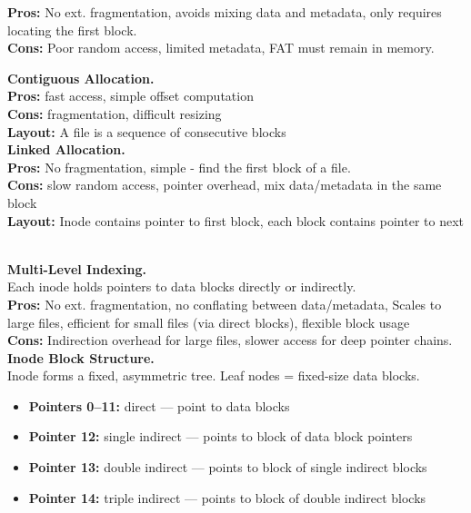 \documentclass[8pt]{extarticle}
\begin{document}
\begin{minipage}[htp]{0.5\textwidth}
\begin{minipage}[htp]{0.49\textwidth}
\textbf{Pros:} No ext. fragmentation, avoids mixing data and metadata, only requires locating the first block.\\
\textbf{Cons:} Poor random access, limited metadata, FAT must remain in memory.
\end{minipage}
\hfill
\begin{minipage}[htp]{0.49\textwidth}
\noindent\textbf{Contiguous Allocation.}\\
\textbf{Pros:} fast access, simple offset computation\\
\textbf{Cons:} fragmentation, difficult resizing\\
\textbf{Layout:} A file is a sequence of consecutive blocks\\[5px]
\noindent\textbf{Linked Allocation.}\\
\textbf{Pros:} No fragmentation, simple - find the first block of a file. \\\textbf{Cons:} slow random access, pointer overhead, mix data/metadata in the same block \\
\textbf{Layout:} Inode contains pointer to first block, each block contains pointer to next
\end{minipage}\\[2px]
\textbf{Multi-Level Indexing.} \\
Each inode holds pointers to data blocks directly or indirectly.\\
\noindent\textbf{Pros:} No ext. fragmentation, no conflating between data/metadata, Scales to large files, efficient for small files (via direct blocks), flexible block usage\\
\noindent\textbf{Cons:} Indirection overhead for large files, slower access for deep pointer chains.
\noindent\textbf{Inode Block Structure.} \\
Inode forms a fixed, asymmetric tree. Leaf nodes = fixed-size data blocks.
\begin{itemize}[noitemsep,topsep=0pt]
    \item \textbf{Pointers 0–11:} direct — point to data blocks
    \item \textbf{Pointer 12:} single indirect — points to block of data block pointers
    \item \textbf{Pointer 13:} double indirect — points to block of single indirect blocks
    \item \textbf{Pointer 14:} triple indirect — points to block of double indirect blocks
\end{itemize}
\vspace*{-10px}

\end{minipage}
\end{document}
